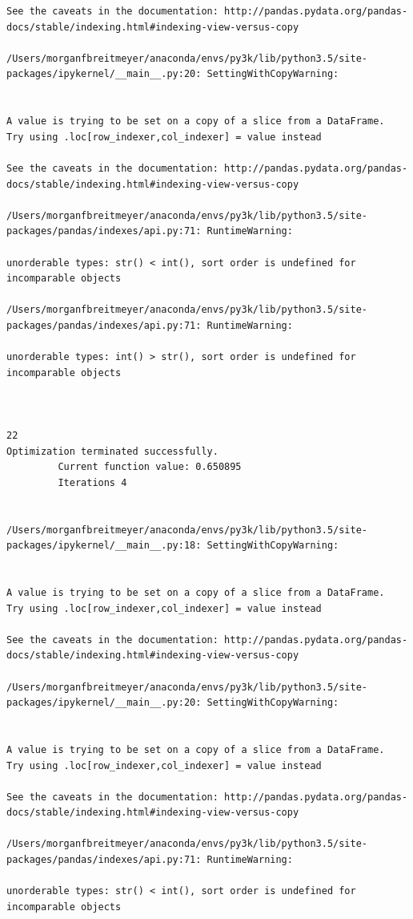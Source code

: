 \begin{lstlisting}
See the caveats in the documentation: http://pandas.pydata.org/pandas-docs/stable/indexing.html#indexing-view-versus-copy

/Users/morganfbreitmeyer/anaconda/envs/py3k/lib/python3.5/site-packages/ipykernel/__main__.py:20: SettingWithCopyWarning:


A value is trying to be set on a copy of a slice from a DataFrame.
Try using .loc[row_indexer,col_indexer] = value instead

See the caveats in the documentation: http://pandas.pydata.org/pandas-docs/stable/indexing.html#indexing-view-versus-copy

/Users/morganfbreitmeyer/anaconda/envs/py3k/lib/python3.5/site-packages/pandas/indexes/api.py:71: RuntimeWarning:

unorderable types: str() < int(), sort order is undefined for incomparable objects

/Users/morganfbreitmeyer/anaconda/envs/py3k/lib/python3.5/site-packages/pandas/indexes/api.py:71: RuntimeWarning:

unorderable types: int() > str(), sort order is undefined for incomparable objects



22
Optimization terminated successfully.
         Current function value: 0.650895
         Iterations 4


/Users/morganfbreitmeyer/anaconda/envs/py3k/lib/python3.5/site-packages/ipykernel/__main__.py:18: SettingWithCopyWarning:


A value is trying to be set on a copy of a slice from a DataFrame.
Try using .loc[row_indexer,col_indexer] = value instead

See the caveats in the documentation: http://pandas.pydata.org/pandas-docs/stable/indexing.html#indexing-view-versus-copy

/Users/morganfbreitmeyer/anaconda/envs/py3k/lib/python3.5/site-packages/ipykernel/__main__.py:20: SettingWithCopyWarning:


A value is trying to be set on a copy of a slice from a DataFrame.
Try using .loc[row_indexer,col_indexer] = value instead

See the caveats in the documentation: http://pandas.pydata.org/pandas-docs/stable/indexing.html#indexing-view-versus-copy

/Users/morganfbreitmeyer/anaconda/envs/py3k/lib/python3.5/site-packages/pandas/indexes/api.py:71: RuntimeWarning:

unorderable types: str() < int(), sort order is undefined for incomparable objects


\end{lstlisting}
